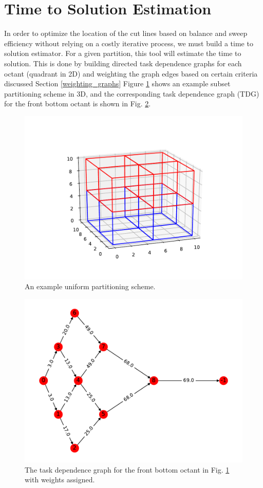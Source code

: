 \documentclass[11pt, letterpaper,titlepage,oneside]{article}
\begin{document}
\section{Time to Solution Estimation} \label{TOS}

In order to optimize the location of the cut lines based on balance and sweep efficiency without relying on a costly iterative process, we must build a time to solution estimator. For a given partition, this tool will estimate the time to solution. This is done by building directed task dependence graphs for each octant (quadrant in 2D) and weighting the graph edges based on certain criteria discussed Section \ref{weighting_graphs} Figure \ref{subset_plot} shows an example subset partitioning scheme in 3D, and the corresponding task dependence graph (TDG) for the front bottom octant is shown in Fig. \ref{digraph}.

\begin{figure}[H]
\centering
\includegraphics{../figures/subset_plot.pdf}
\caption{An example uniform partitioning scheme.}
\label{subset_plot}
\end{figure}

\begin{figure}[H]
\centering
\includegraphics{../figures/digraph.pdf}
\caption{The task dependence graph for the front bottom octant in Fig. \ref{subset_plot} with weights assigned.}
\label{digraph}
\end{figure}
\end{document}

